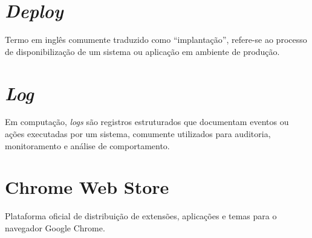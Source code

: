 \section{\textit{Deploy}}
Termo em inglês comumente traduzido como ``implantação'', refere-se ao processo de disponibilização de um sistema ou aplicação em ambiente de produção.

\section{\textit{Log}}
Em computação, \textit{logs} são registros estruturados que documentam eventos ou ações executadas por um sistema, comumente utilizados para auditoria, monitoramento e análise de comportamento.



\section{Chrome Web Store}
Plataforma oficial de distribuição de extensões, aplicações e temas para o navegador Google Chrome.

